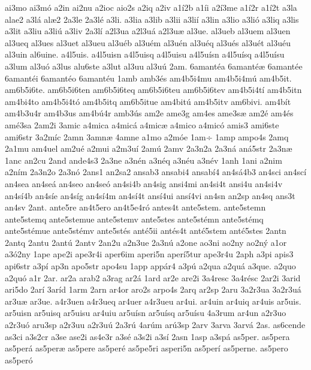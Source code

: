 {ai3mo
ai3m^^f3
a2in
ai2nu
a2ioc
aio2s
a2iq
a2iv
a1^^ed2b
a1^^edi
a2^^ed3me
a1^^ed2r
a1^^ed2t
a3la
alae2
a3l^^e1
al^^e62
2a3le
2a3l^^e9
a3li.
a3lia
a3lib
a3lii
a3li^^ed
a3lin
a3lio
a3li^^f3
a3liq
a3lis
a3lit
a3liu
a3li^^fa
a3liv
2a3l^^ed
a2l3ua
a2l3u^^e1
a2l3u^^e6
al3ue.
al3ueb
al3uem
al3uen
al3ueq
al3ues
al3uet
al3ueu
al3u^^e9b
al3u^^e9m
al3u^^e9n
al3u^^e9q
al3u^^e9s
al3u^^e9t
al3u^^e9u
al3uin
al6uine.
a4l5uis.
a4l5uisn
a4l5uisq
a4l5uisu
a4l5u^^edsn
a4l5u^^edsq
a4l5u^^edsu
a3lum
al3u^^f3
a3lus
alu6ste
a3lut
al3uu
al3u^^fa
2am.
6amant^^e9a
6amant^^e9^^e6
6amant^^e9e
6amant^^e9i
6amant^^e9o
6amant^^e9u
1amb
amb3^^e9s
am4b5i4mu
am4b5i4m^^fa
am4b5it.
am6b5i6te.
am6b5i6ten
am6b5i6teq
am6b5i6teu
am6b5i6tev
am4b5i4t^^ed
am4b5itn
am4bi4to
am4b5i4t^^f3
am4b5itq
am6b5itue
am4bit^^fa
am4b5itv
am6bivi.
am4b^^edt
am4b3u4r
am4b3us
am4b^^fa4r
amb3^^fas
am2e
ame3g
am4es
ame3s^^e6
am2^^e9
am4^^e9s
am^^e93sa
2am2i
3amic
a4mica
a4mic^^e1
a4mic^^e6
a4mico
a4mic^^f3
amis3
ami6ste
ami6str
3a2m^^edc
2amn
3amn^^e6
4amne
a1mo
a2m^^f3e
1am^^f7
1amp
ampo4s
2amq
2a1mu
am4uel
am2u^^e9
a2mui
a2m3u^^ed
2am^^fa
2amv
2a3n2a
2a3n^^e1
an^^e15str
2a3n^^e6
1anc
an2cu
2and
ande4s3
2a3ne
a3n^^e9n
a3n^^e9q
a3n^^e9u
a3n^^e9v
1anh
1ani
a2nim
a2n^^edm
2a3n2o
2a3n^^f3
2ans1
an2sa2
ansab3
ansabi4
ansab^^ed4
an4s^^e14b3
an4sci
an4sc^^ed
an4sea
an4se^^e1
an4seo
an4se^^f3
an4si4b
an4sig
ansi4mi
an4si4t
ansi4u
an4si4v
an4s^^ed4b
an4s^^ede
an4s^^edg
an4s^^ed4m
an4s^^ed4t
ans^^ed4ui
ans^^ed4vi
an4sn
an2sp
an4sq
ans3t
an4sv
2ant.
ante5re
an4t5ero
an4t5e4r^^f3
antes4t
ante5stem.
ante5stemn
ante5stemq
ante5stemue
ante5stemv
ante5stes
ante5st^^e9mn
ante5st^^e9mq
ante5st^^e9mue
ante5st^^e9mv
ante5st^^e9s
ant^^e95ii
ant^^e9s4t
ant^^e95stem
ant^^e95stes
2antn
2antq
2antu
2ant^^fa
2antv
2an2u
a2n3ue
2a3n^^fa
a2one
ao3ni
ao2ny
ao2n^^fd
a1or
a3^^f32ny
1ape
ape2i
ape3r4i
aper6im
aperi5n
aper^^ed5tur
ape3r4u
2aph
a3pi
apis3
api6str
a3p^^ed
ap3n
apo5str
apo4su
1app
app^^e1r4
a3p^^fa
a2qua
a2qu^^e1
a3que.
a2quo
a2qu^^f3
a1r
2ar.
ar2a
arab2
a3rag
ar2^^e1
1ard
ar2e
are2i
3a4resc
3a4r^^e9sc
2ar2i
3arid
ari5do
2ar^^ed
3ar^^edd
1arm
2arn
ar4or
aro2s
arpo4s
2arq
ar2sp
2aru
3a2r3ua
3a2r3u^^e1
ar3u^^e6
ar3ue.
a4r3uen
a4r3ueq
ar4uer
a4r3ueu
ar4ui.
ar4uin
ar4uiq
ar4uis
ar5uis.
ar5uisn
ar5uisq
ar5uisu
ar4uiu
ar5u^^edsn
ar5u^^edsq
ar5u^^edsu
4a3rum
ar4un
a2r3uo
a2r3u^^f3
aru3sp
a2r3uu
a2r3u^^fa
2a3r^^fa
4ar^^fam
ar^^fa3sp
2arv
3arva
3arv^^e1
2as.
as6cende
as3ci
a3s2cr
a3se
ase2i
as4e3r
a3s^^e9
a3s2i
a3s^^ed
2asn
1asp
a3sp^^e1
as5per.
as5pera
as5per^^e1
as5per^^e6
as5pere
as5per^^e9
as5pe5ri
asperi5n
as5per^^ed
as5perne.
as5pero
as5per^^f3
}
